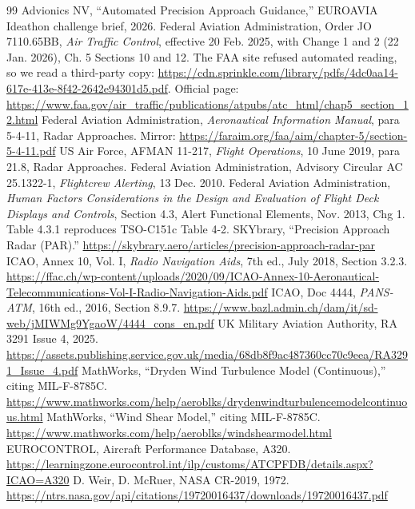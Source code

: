 \documentclass{ideathon2026}
\begin{document}
\clearpage
\begin{thebibliography}{99}
 Advionics NV, ``Automated Precision Approach Guidance,'' EUROAVIA Ideathon challenge brief, 2026.
 Federal Aviation Administration, Order JO 7110.65BB, \emph{Air Traffic Control}, effective 20 Feb. 2025, with Change 1 and 2 (22 Jan. 2026), Ch. 5 Sections 10 and 12. The FAA site refused automated reading, so we read a third-party copy: \url{https://cdn.sprinkle.com/library/pdfs/4dc0aa14-617e-413e-8f42-2642e94301d5.pdf}. Official page: \url{https://www.faa.gov/air_traffic/publications/atpubs/atc_html/chap5_section_12.html}
 Federal Aviation Administration, \emph{Aeronautical Information Manual}, para 5-4-11, Radar Approaches. Mirror: \url{https://faraim.org/faa/aim/chapter-5/section-5-4-11.pdf}
 US Air Force, AFMAN 11-217, \emph{Flight Operations}, 10 June 2019, para 21.8, Radar Approaches.
 Federal Aviation Administration, Advisory Circular AC 25.1322-1, \emph{Flightcrew Alerting}, 13 Dec. 2010.
 Federal Aviation Administration, \emph{Human Factors Considerations in the Design and Evaluation of Flight Deck Displays and Controls}, Section 4.3, Alert Functional Elements, Nov. 2013, Chg 1. Table 4.3.1 reproduces TSO-C151c Table 4-2.
 SKYbrary, ``Precision Approach Radar (PAR).'' \url{https://skybrary.aero/articles/precision-approach-radar-par}
 ICAO, Annex 10, Vol. I, \emph{Radio Navigation Aids}, 7th ed., July 2018, Section 3.2.3. \url{https://ffac.ch/wp-content/uploads/2020/09/ICAO-Annex-10-Aeronautical-Telecommunications-Vol-I-Radio-Navigation-Aids.pdf}
 ICAO, Doc 4444, \emph{PANS-ATM}, 16th ed., 2016, Section 8.9.7. \url{https://www.bazl.admin.ch/dam/it/sd-web/jMIWMg9YgaoW/4444_cons_en.pdf}
 UK Military Aviation Authority, RA 3291 Issue 4, 2025. \url{https://assets.publishing.service.gov.uk/media/68db8f9ac487360cc70c9eea/RA3291_Issue_4.pdf}
 MathWorks, ``Dryden Wind Turbulence Model (Continuous),'' citing MIL-F-8785C. \url{https://www.mathworks.com/help/aeroblks/drydenwindturbulencemodelcontinuous.html}
 MathWorks, ``Wind Shear Model,'' citing MIL-F-8785C. \url{https://www.mathworks.com/help/aeroblks/windshearmodel.html}
 EUROCONTROL, Aircraft Performance Database, A320. \url{https://learningzone.eurocontrol.int/ilp/customs/ATCPFDB/details.aspx?ICAO=A320}
 D. Weir, D. McRuer, NASA CR-2019, 1972. \url{https://ntrs.nasa.gov/api/citations/19720016437/downloads/19720016437.pdf}

\end{thebibliography}
\end{document}
